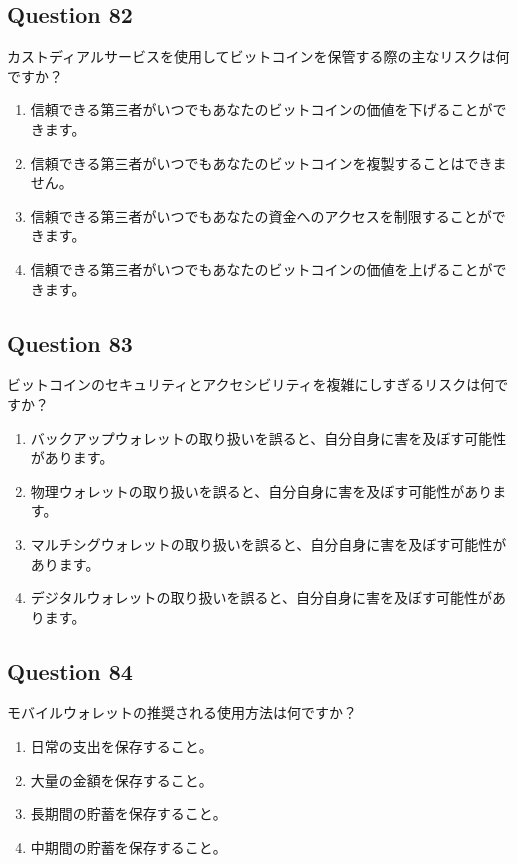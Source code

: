 \documentclass[12pt,a4paper]{article}
\begin{document}
\bigskip


\subsection*{Question 82}
カストディアルサービスを使用してビットコインを保管する際の主なリスクは何ですか？

\begin{enumerate}[label=\Alph*., leftmargin=*]
\item 信頼できる第三者がいつでもあなたのビットコインの価値を下げることができます。
\item 信頼できる第三者がいつでもあなたのビットコインを複製することはできません。
\item 信頼できる第三者がいつでもあなたの資金へのアクセスを制限することができます。
\item 信頼できる第三者がいつでもあなたのビットコインの価値を上げることができます。
\end{enumerate}

\bigskip


\subsection*{Question 83}
ビットコインのセキュリティとアクセシビリティを複雑にしすぎるリスクは何ですか？

\begin{enumerate}[label=\Alph*., leftmargin=*]
\item バックアップウォレットの取り扱いを誤ると、自分自身に害を及ぼす可能性があります。
\item 物理ウォレットの取り扱いを誤ると、自分自身に害を及ぼす可能性があります。
\item マルチシグウォレットの取り扱いを誤ると、自分自身に害を及ぼす可能性があります。
\item デジタルウォレットの取り扱いを誤ると、自分自身に害を及ぼす可能性があります。
\end{enumerate}

\bigskip


\subsection*{Question 84}
モバイルウォレットの推奨される使用方法は何ですか？

\begin{enumerate}[label=\Alph*., leftmargin=*]
\item 日常の支出を保存すること。
\item 大量の金額を保存すること。
\item 長期間の貯蓄を保存すること。
\item 中期間の貯蓄を保存すること。
\end{enumerate}
\end{document}

